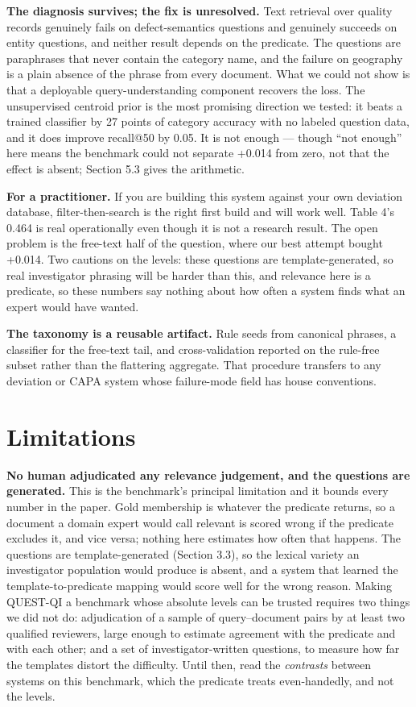 \documentclass[runningheads]{llncs}
\begin{document}
\textbf{The diagnosis survives; the fix is unresolved.} Text retrieval over quality records genuinely fails on defect-semantics questions and genuinely succeeds on entity questions, and neither result depends on the predicate. The questions are paraphrases that never contain the category name, and the failure on geography is a plain absence of the phrase from every document. What we could not show is that a deployable query-understanding component recovers the loss. The unsupervised centroid prior is the most promising direction we tested: it beats a trained classifier by 27 points of category accuracy with no labeled question data, and it does improve recall@50 by 0.05. It is not enough --- though ``not enough'' here means the benchmark could not separate +0.014 from zero, not that the effect is absent; Section 5.3 gives the arithmetic.

\textbf{For a practitioner.} If you are building this system against your own deviation database, filter-then-search is the right first build and will work well. Table 4's 0.464 is real operationally even though it is not a research result. The open problem is the free-text half of the question, where our best attempt bought +0.014. Two cautions on the levels: these questions are template-generated, so real investigator phrasing will be harder than this, and relevance here is a predicate, so these numbers say nothing about how often a system finds what an expert would have wanted.

\textbf{The taxonomy is a reusable artifact.} Rule seeds from canonical phrases, a classifier for the free-text tail, and cross-validation reported on the rule-free subset rather than the flattering aggregate. That procedure transfers to any deviation or CAPA system whose failure-mode field has house conventions.


\section{Limitations}
\textbf{No human adjudicated any relevance judgement, and the questions are generated.} This is the benchmark's principal limitation and it bounds every number in the paper. Gold membership is whatever the predicate returns, so a document a domain expert would call relevant is scored wrong if the predicate excludes it, and vice versa; nothing here estimates how often that happens. The questions are template-generated (Section 3.3), so the lexical variety an investigator population would produce is absent, and a system that learned the template-to-predicate mapping would score well for the wrong reason. Making QUEST-QI a benchmark whose absolute levels can be trusted requires two things we did not do: adjudication of a sample of query--document pairs by at least two qualified reviewers, large enough to estimate agreement with the predicate and with each other; and a set of investigator-written questions, to measure how far the templates distort the difficulty. Until then, read the \textit{contrasts} between systems on this benchmark, which the predicate treats even-handedly, and not the levels.
\end{document}
